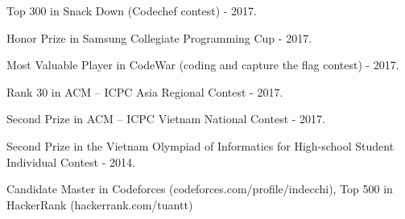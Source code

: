 
\begin{cvempty}

\begin{cvitems} %
  \item {Top 300 in Snack Down (Codechef contest) - 2017.}
  \item {Honor Prize in Samsung Collegiate Programming Cup - 2017.}
  \item {Most Valuable Player in CodeWar (coding and capture the flag contest) - 2017.}
  \item {Rank 30 in ACM – ICPC Asia Regional Contest - 2017.}
  \item {Second Prize in ACM – ICPC Vietnam National Contest - 2017.}
  \item {Second Prize in the Vietnam Olympiad of Informatics for High-school Student Individual Contest - 2014.}
  \item {Candidate Master in Codeforces (codeforces.com/profile/indecchi), Top 500 in HackerRank (hackerrank.com/tuantt)}
\end{cvitems}

\end{cvempty}

